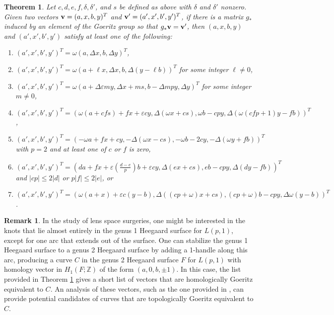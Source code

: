 \documentclass{amsart}     %
\newtheorem{thm}{Theorem}[section]    %
\theoremstyle{definition}
\newtheorem{rem}{Remark}             %
\begin{document}
\begin{thm}\label{thm:vectorlist} Let $c, d, e, f, \delta, \delta'$, and $s$ be defined as above with $\delta$ and $\delta'$ nonzero.
Given two vectors ${\bf v}  = (a, x, b, y)^T$ and ${\bf{v}}' = (a',x',b',y')^T$, if there is a matrix $g_*$ induced by an element of the Goeritz group so that $g_* {\bf v}= {\bf v}'$, then $(a,x,b,y)$ and $(a', x', b', y')$ satisfy at least one of the following:

\begin{enumerate}
\item\label{list:bg}  $(a', x', b', y')^T =\omega ( a, \Delta x, b, \Delta y)^T$,
\item\label{list:pb}  $(a', x', b', y')^T = \omega(a + \ell x, \Delta x, b, \Delta (y - \ell b))^T$ for some integer $\ell \neq 0$,
\item\label{list:lav}  $(a', x', b', y')^T = \omega(a + \Delta \varepsilon my, \Delta x + ms, b - \Delta mpy, \Delta y)^T$ for some integer $m \neq 0$,
\item\label{list:gray}  $(a', x', b', y')^T = (\omega(a + cf s)+f x  + \varepsilon c y, \Delta (\omega x +   c s),  \omega b - c p y , \Delta( \omega(cfp + 1) y-fb))^T$,
\item\label{list:or1}  $(a', x', b', y')^T = (-\omega a + fx + cy, -\Delta ( \omega x - c s), -\omega b - 2cy, -\Delta (\omega y + fb) )^T $ with $p = 2$ and at least one of $c$ or $f$ is zero,
\item\label{list:or2}  $(a', x', b', y')^T =  \left(da + fx + \varepsilon\left(\frac{d-e}{p}\right)b + \varepsilon cy, \Delta (ex + cs), eb - cp y, \Delta(dy - fb)\right)^T$ and  $|cp | \leq 2|d| $ or $p| f |  \leq  2 | e |$, or
\item\label{list:bb}  $(a', x', b', y')^T = (\omega (a + x) + \varepsilon c (y-b), \Delta ((cp + \omega) x + c s) , (cp+\omega) b - cp y, \Delta\omega (y-b))^T$. \end{enumerate}
\end{thm}

\begin{rem}
In the study of lens space surgeries, one might be interested in the knots that lie almost entirely in the genus 1 Heegaard surface for $L(p,1)$, except for one arc that extends out of the surface. One can stabilize the genus 1 Heegaard surface to a genus 2 Heegaard surface by adding a 1-handle along this arc, producing a curve $C$ in the genus 2 Heegaard surface $F$ for $L(p,1)$ with homology vector in $H_1(F; \mathbb Z)$ of the form $(a, 0, b, \pm 1)$. In this case, the list provided in Theorem \ref{thm:vectorlist} gives a short list of vectors that are homologically Goeritz equivalent to $C$. An analysis of these vectors, such as the one provided in \cite{DolRatG2GES3}, can provide potential candidates of curves that are topologically Goeritz equivalent to $C$.
\end{rem}
\end{document}

